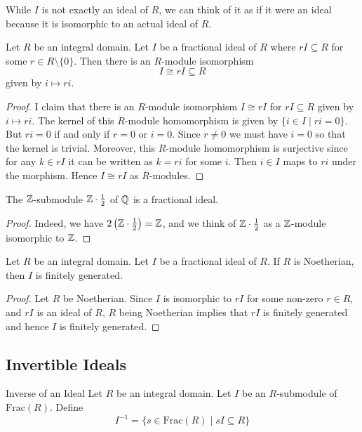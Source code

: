 \documentclass[a4paper]{article}
\begin{document}
While $I$ is not exactly an ideal of $R$, we can think of it as if it were an ideal because it is isomorphic to an actual ideal of $R$. 

\begin{lmm}{}{} Let $R$ be an integral domain. Let $I$ be a fractional ideal of $R$ where $rI\subseteq R$ for some $r\in R\setminus\{0\}$. Then there is an $R$-module isomorphism $$I\cong rI\subseteq R$$ given by $i\mapsto ri$. 
\begin{proof}
I claim that there is an $R$-module isomorphism $I\cong rI$ for $rI\subseteq R$ given by $i\mapsto ri$. The kernel of this $R$-module homomorphism is given by $\{i\in I\;|\;ri=0\}$. But $ri=0$ if and only if $r=0$ or $i=0$. Since $r\neq 0$ we must have $i=0$ so that the kernel is trivial. Moreover, this $R$-module homomorphism is surjective since for any $k\in rI$ it can be written as $k=ri$ for some $i$. Then $i\in I$ maps to $ri$ under the morphism. Hence $I\cong rI$ as $R$-modules. 
\end{proof}
\end{lmm}

\begin{eg}{}{} The $\mathbb{Z}$-submodule $\mathbb{Z}\cdot\frac{1}{2}$ of $\mathbb{Q}$ is a fractional ideal. 
\begin{proof}
Indeed, we have $2\left(\mathbb{Z}\cdot\frac{1}{2}\right)=\mathbb{Z}$, and we think of $\mathbb{Z}\cdot\frac{1}{2}$ as a $\mathbb{Z}$-module isomorphic to $\mathbb{Z}$. 
\end{proof}
\end{eg}

\begin{lmm}{}{} Let $R$ be an integral domain. Let $I$ be a fractional ideal of $R$. If $R$ is Noetherian, then $I$ is finitely generated. 
\begin{proof}
Let $R$ be Noetherian. Since $I$ is isomorphic to $rI$ for some non-zero $r\in R$, and $rI$ is an ideal of $R$, $R$ being Noetherian implies that $rI$ is finitely generated and hence $I$ is finitely generated. 
\end{proof}
\end{lmm}

\subsection{Invertible Ideals}
\begin{defn}{Inverse of an Ideal}{} Let $R$ be an integral domain. Let $I$ be an $R$-submodule of $\text{Frac}(R)$. Define $$I^{-1}=\{s\in\text{Frac}(R)\;|\;sI\subseteq R\}$$
\end{defn}
\end{document}
